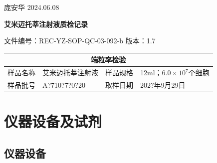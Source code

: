 \documentclass[UTF8,10pt,a4paper,fontset=fandol]{ctexart}
\newcommand{\fieldvalue}[1]{#1}
\newcommand{\handwritten}[1]{#1}
\begin{document}
\medskip

\fieldvalue{\handwritten{庞安华}}
\hspace{1em}
\fieldvalue{\handwritten{2024.06.08}}

\newpage

\begin{center}
\textbf{艾米迈托莘注射液质检记录}
\end{center}

\noindent
文件编号：REC-YZ-SOP-QC-03-092-b \hfill 版本：1.7

\begin{center}
\begin{tabular}{|p{3.0cm}|p{5.0cm}|p{3.0cm}|p{5.0cm}|}
\hline
\multicolumn{4}{|c|}{\textbf{端粒率检验}}\\
\hline
样品名称 & 艾米迈托莘注射液 & 样品规格 & 12ml；$6.0\times10^{7}$个细胞\\
\hline
样品批号 &
\fieldvalue{\handwritten{A?710?7?0?20}}
&
取样日期 &
\fieldvalue{\handwritten{202?年9月29日}}
\\
\hline
\end{tabular}
\end{center}

\section{仪器设备及试剂}

\subsection{仪器设备}
\end{document}
